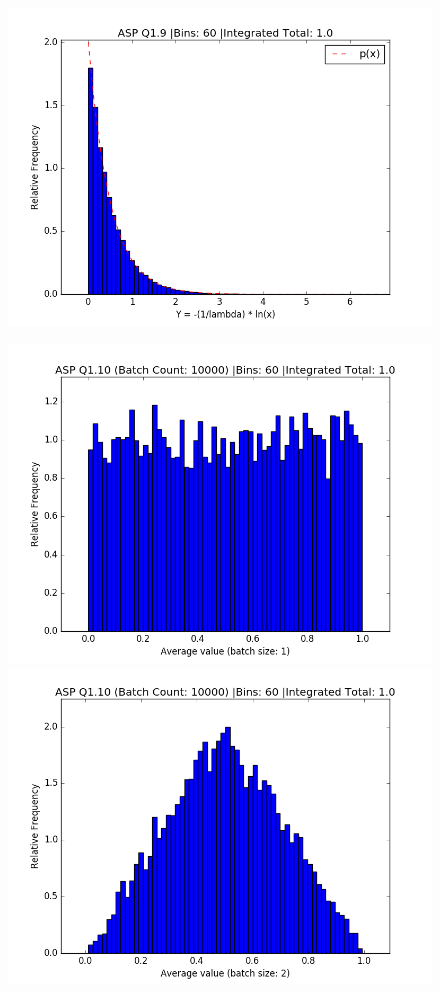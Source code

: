 \documentclass[]{article}
\begin{document}
	
\begin{figure}[h]
\centering
\includegraphics[width=0.6\linewidth]{one_nine}
\end{figure}


\begin{figure}[h]
	\label{fig:parabola_1a}
	\centering
	\begin{minipage}[h]{0.45\linewidth}
		\includegraphics[width=1\linewidth]{one_ten_one}
	\end{minipage}
	\quad
	\begin{minipage}[h]{0.45\linewidth}
		\includegraphics[width=1\linewidth]{one_ten_two}
	\end{minipage}
\end{figure}
\end{document}

